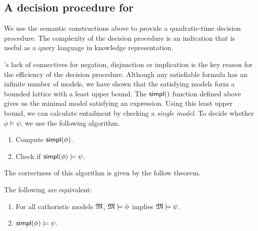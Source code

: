 \subsection{A decision procedure for \cathoristic{}}\label{decisionprocedure}

We use the semantic constructions above to provide a quadratic-time
decision procedure.  The complexity of the decision procedure is an
indication that \cathoristic{} is useful as a query language in knowledge
representation.

\Cathoristic{}'s lack of connectives for negation, disjunction or
implication is the key reason for the efficiency of the decision
procedure.  Although any satisfiable formula has an infinite number of
models, we have shown that the satisfying models form a bounded
lattice with a least upper bound.  The $\SIMPL$ function defined above
gives us the minimal model satisfying an expression.  Using this least
upper bound, we can calculate entailment by checking a \emph{single
  model}.  To decide whether $\phi \models \psi$, we use the following
algorithm.

\begin{enumerate}

\item Compute $\mathsf{simpl}(\phi)$.

\item Check if $\mathsf{simpl}(\phi) \models \psi$.

\end{enumerate}

\NI The correctness of this algorithm is given by the follow theorem.

\begin{theorem}\label{theorem:decision}
  The following are equivalent:
  \begin{enumerate}
    \item\label{theorem:decision:1} For all cathoristic models $\frak{M}$,
      $\frak{M} \models \phi$ implies $\frak{M} \models \psi$.
    \item\label{theorem:decision:2} $\mathsf{simpl}(\phi) \models \psi$.
  \end{enumerate}
\end{theorem}

